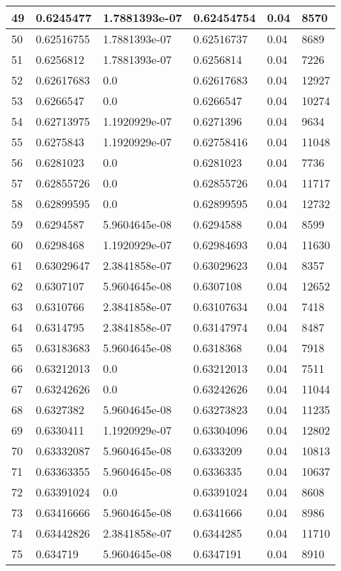 \begin{longtable}{|l|l|l|l|l|l|}
49 & 0.6245477 & 1.7881393e-07 & 0.62454754 & 0.04 & 8570 \\ \hline 
50 & 0.62516755 & 1.7881393e-07 & 0.62516737 & 0.04 & 8689 \\ \hline 
51 & 0.6256812 & 1.7881393e-07 & 0.6256814 & 0.04 & 7226 \\ \hline 
52 & 0.62617683 & 0.0 & 0.62617683 & 0.04 & 12927 \\ \hline 
53 & 0.6266547 & 0.0 & 0.6266547 & 0.04 & 10274 \\ \hline 
54 & 0.62713975 & 1.1920929e-07 & 0.6271396 & 0.04 & 9634 \\ \hline 
55 & 0.6275843 & 1.1920929e-07 & 0.62758416 & 0.04 & 11048 \\ \hline 
56 & 0.6281023 & 0.0 & 0.6281023 & 0.04 & 7736 \\ \hline 
57 & 0.62855726 & 0.0 & 0.62855726 & 0.04 & 11717 \\ \hline 
58 & 0.62899595 & 0.0 & 0.62899595 & 0.04 & 12732 \\ \hline 
59 & 0.6294587 & 5.9604645e-08 & 0.6294588 & 0.04 & 8599 \\ \hline 
60 & 0.6298468 & 1.1920929e-07 & 0.62984693 & 0.04 & 11630 \\ \hline 
61 & 0.63029647 & 2.3841858e-07 & 0.63029623 & 0.04 & 8357 \\ \hline 
62 & 0.6307107 & 5.9604645e-08 & 0.6307108 & 0.04 & 12652 \\ \hline 
63 & 0.6310766 & 2.3841858e-07 & 0.63107634 & 0.04 & 7418 \\ \hline 
64 & 0.6314795 & 2.3841858e-07 & 0.63147974 & 0.04 & 8487 \\ \hline 
65 & 0.63183683 & 5.9604645e-08 & 0.6318368 & 0.04 & 7918 \\ \hline 
66 & 0.63212013 & 0.0 & 0.63212013 & 0.04 & 7511 \\ \hline 
67 & 0.63242626 & 0.0 & 0.63242626 & 0.04 & 11044 \\ \hline 
68 & 0.6327382 & 5.9604645e-08 & 0.63273823 & 0.04 & 11235 \\ \hline 
69 & 0.6330411 & 1.1920929e-07 & 0.63304096 & 0.04 & 12802 \\ \hline 
70 & 0.63332087 & 5.9604645e-08 & 0.6333209 & 0.04 & 10813 \\ \hline 
71 & 0.63363355 & 5.9604645e-08 & 0.6336335 & 0.04 & 10637 \\ \hline 
72 & 0.63391024 & 0.0 & 0.63391024 & 0.04 & 8608 \\ \hline 
73 & 0.63416666 & 5.9604645e-08 & 0.6341666 & 0.04 & 8986 \\ \hline 
74 & 0.63442826 & 2.3841858e-07 & 0.6344285 & 0.04 & 11710 \\ \hline 
75 & 0.634719 & 5.9604645e-08 & 0.6347191 & 0.04 & 8910 \\ \hline 
\end{longtable}